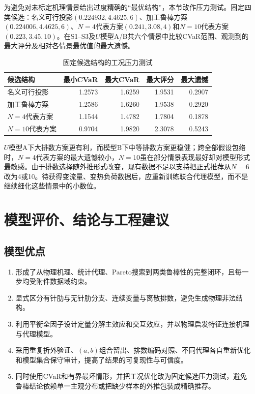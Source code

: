 \documentclass[UTF8,12pt,a4paper]{ctexart}
\begin{document}
为避免对未标定机理情景给出过度精确的“最优结构”，本节改作压力测试。固定四类候选：名义可行投影$(0.224932,4.4625,6)$、加工鲁棒方案$(0.224006,4.4625,6)$、$N=4$代表方案$(0.241,3.08,4)$和$N=10$代表方案$(0.223,3.45,10)$。在S1--S3及$U$模型A/B共六个情景中比较CVaR范围、观测到的最大评分及相对各情景最优值的最大遗憾。

\begin{table}[H]\centering\small
\caption{固定候选结构的工况压力测试}
\begin{tabular}{lrrrr}
\toprule
候选结构&最小CVaR&最大CVaR&最大评分&最大遗憾\\\midrule
名义可行投影&1.2573&1.6259&1.9531&0.2907\\
加工鲁棒方案&1.2586&1.6260&1.9538&0.2920\\
$N=4$代表方案&1.1544&1.4782&1.7804&0.1878\\
$N=10$代表方案&0.9704&1.9820&2.3078&0.5243\\
\bottomrule
\end{tabular}
\end{table}
$U$模型A下大排数方案更有利，而模型B下中等排数方案更稳健；跨全部假设包络时，$N=4$代表方案的最大遗憾较小，$N=10$虽在部分情景表现最好却对模型形式最敏感。由于排数选择随外推形式改变，现有数据不足以支持把正式推荐从$N=6$改为4或10。待获得变流量、变热负荷数据后，应重新训练联合代理模型，而不是继续细化这些情景中的小数位。

\section{模型评价、结论与工程建议}

\subsection{模型优点}
\begin{enumerate}
  \item 形成了从物理机理、统计代理、Pareto搜索到两类鲁棒性的完整闭环，且每一步均受附件数据域约束。
  \item 显式区分有针肋与无针肋分支、连续变量与离散排数，避免生成物理非法结构。
  \item 利用平衡全因子设计定量分解主效应和交互效应，并以物理启发特征连接机理与代理模型。
  \item 采用重复折外验证、$(a,b)$组合留出、排数编码对照、不同代理各自重新优化和模型集合保守审计，提高了结果的可复现性与可信度。
  \item 同时使用CVaR和有界最坏情形，并把工况优化改为固定候选压力测试，避免鲁棒结论依赖单一主观分布或把缺少样本的外推包装成精确推荐。
\end{enumerate}
\end{document}
